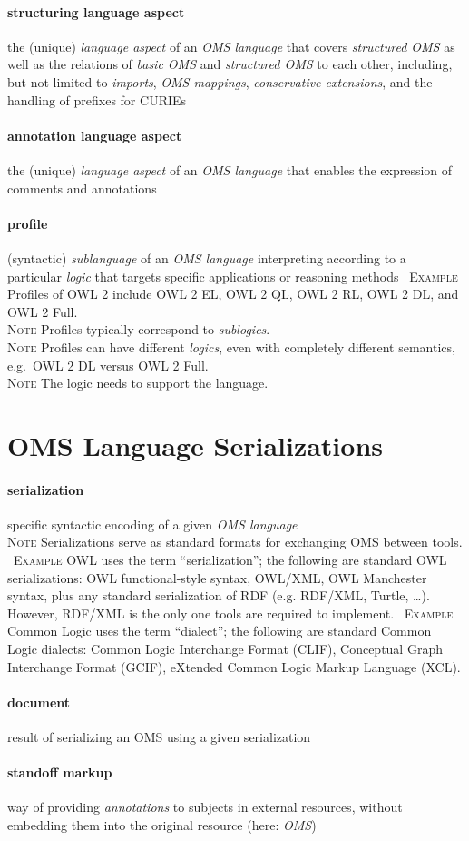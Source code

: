 \documentclass[10pt,%
\ifpretendfinal
final%
\else
draft%
\fi,
]{scrreprt}
\makeatletter
\newcommand*{\eg}{e.g.\@\xspace}
\newcommand*{\termref}[1]{\textit{#1}}
\newcommand{\sclause}[1]{\section{#1}}
\newcommand{\termdefinition}[2]{\paragraph{#1} #2}
\newenvironment{definitions}[0]{\medskip }{}
\newenvironment{note}[0]{\ \\ \textsc{Note} \quad}{}
\newenvironment{example}[0]{\ \newline \textsc{Example}\quad }{}
\makeatother
\begin{document}
\begin{definitions}
  \termdefinition{structuring language aspect}{the (unique) \termref{language aspect} of an \termref{OMS language} that covers \termref{structured OMS} as well as the relations of \termref{basic OMS} and \termref{structured OMS} to each other, including, but not limited to \termref{imports}, \termref{OMS mappings}, \termref{conservative extensions}, and the handling of prefixes for CURIEs}

  \termdefinition{annotation language aspect}{the (unique) \termref{language aspect} of an \termref{OMS language} that enables the  expression of comments and annotations}

  \termdefinition{profile}{(syntactic) \termref{sublanguage} of an \termref{OMS language} interpreting according to a particular \termref{logic}
that targets specific applications or reasoning methods}
  \begin{example}
    Profiles of OWL 2 include OWL 2 EL, OWL 2 QL, OWL 2 RL, OWL 2 DL, and OWL 2 Full.
  \end{example}
  \begin{note}
  Profiles typically correspond to \termref{sublogics}.
  \end{note}
  \begin{note}
  Profiles can have different \termref{logics}, even with completely
  different semantics, e.g.\ OWL 2 DL versus OWL 2 Full.
  \end{note}
  \begin{note}
    The logic needs to support the language.
  \end{note}
  
\end{definitions}

\sclause{OMS Language Serializations}

\begin{definitions}
  \termdefinition{serialization}{specific syntactic encoding of a given \termref{OMS language}}
  \begin{note}
    Serializations serve as standard formats for exchanging OMS between tools.
  \end{note}
  \begin{example}
    OWL uses the term ``serialization''; the following are standard OWL serializations: OWL functional-style syntax, OWL/XML, OWL Manchester syntax, plus any standard serialization of RDF (\eg RDF/XML, Turtle, \dots).  However, RDF/XML is the only one tools are required to implement.
  \end{example}
  \begin{example}
    Common Logic uses the term ``dialect''; the following are standard Common Logic dialects: Common Logic Interchange Format (CLIF), Conceptual Graph Interchange Format (GCIF), eXtended Common Logic Markup Language (XCL).
  \end{example}


   \termdefinition{document}{result of serializing an OMS using a given serialization}


  \termdefinition{standoff markup}{way of providing \termref{annotations} to subjects in external resources, without embedding them into the original resource (here: \termref{OMS})}
\end{definitions}
\end{document}

